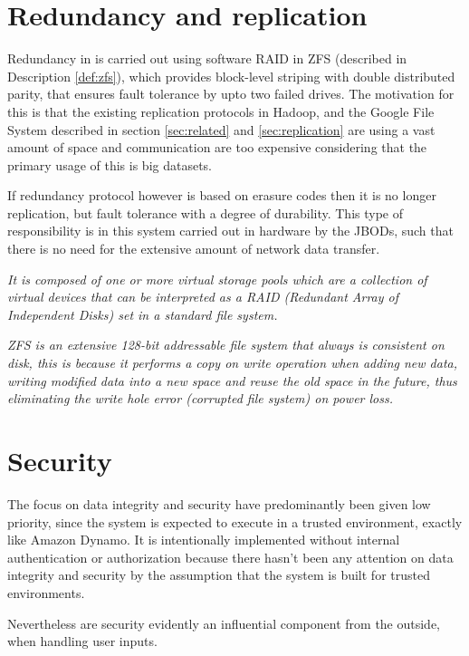 \section{Redundancy and replication}
Redundancy in \CodeName is carried out using \eg software RAID in ZFS (described in Description \ref{def:zfs}), which provides block-level striping with double distributed parity, that ensures fault tolerance by upto two failed drives. The motivation for this is that the existing replication protocols in \eg Hadoop, and the Google File System described in section \ref{sec:related} and \ref{sec:replication} are using a vast amount of space and communication are too expensive considering that the primary usage of this is big datasets.
\newline

If redundancy protocol however is based on erasure codes then it is no longer replication, but fault tolerance with a degree of durability. This type of responsibility is in this system carried out in hardware by the JBODs, such that there is no need for the extensive amount of network data transfer.
\vspace*{2mm}

\begin{definition}[ZFS] \label{def:zfs}
\textit{It is composed of one or more virtual storage pools which are a collection of virtual devices that can be interpreted as a RAID (Redundant Array of Independent Disks) set in a standard file system.}
\newline

\textit{ZFS is an extensive 128-bit addressable file system that always is consistent on disk, this is because it performs a copy on write operation when adding new data, \ie writing modified data into a new space and reuse the old space in the future, thus eliminating the write hole error (corrupted file system) \eg on power loss.}
\end{definition}
\vspace*{2mm}

\section{Security} \label{sec:security}
The focus on data integrity and security have predominantly been given low priority, since the system is expected to execute in a trusted environment, exactly like Amazon Dynamo. It is intentionally implemented without internal authentication or authorization because there hasn't been any attention on data integrity and security by the assumption that the system is built for trusted environments.
\newline

Nevertheless are security evidently an influential component from the outside, when handling user inputs.
